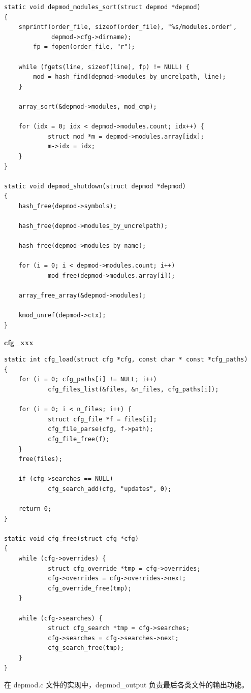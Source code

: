 {\begin{shaded}
\begin{verbatim}
static void depmod_modules_sort(struct depmod *depmod)
{
    snprintf(order_file, sizeof(order_file), "%s/modules.order",
             depmod->cfg->dirname);
        fp = fopen(order_file, "r");

    while (fgets(line, sizeof(line), fp) != NULL) {
        mod = hash_find(depmod->modules_by_uncrelpath, line);
    }

    array_sort(&depmod->modules, mod_cmp);

    for (idx = 0; idx < depmod->modules.count; idx++) {
            struct mod *m = depmod->modules.array[idx];
            m->idx = idx;
    }
}

static void depmod_shutdown(struct depmod *depmod)
{
    hash_free(depmod->symbols);

    hash_free(depmod->modules_by_uncrelpath);

    hash_free(depmod->modules_by_name);

    for (i = 0; i < depmod->modules.count; i++)
            mod_free(depmod->modules.array[i]);

    array_free_array(&depmod->modules);

    kmod_unref(depmod->ctx);
}
\end{verbatim}\end{shaded}}
\textbf{cfg\_xxx}

{\begin{shaded}\begin{verbatim}
static int cfg_load(struct cfg *cfg, const char * const *cfg_paths)
{
    for (i = 0; cfg_paths[i] != NULL; i++)
            cfg_files_list(&files, &n_files, cfg_paths[i]);

    for (i = 0; i < n_files; i++) {
            struct cfg_file *f = files[i];
            cfg_file_parse(cfg, f->path);
            cfg_file_free(f);
    }
    free(files);

    if (cfg->searches == NULL)
            cfg_search_add(cfg, "updates", 0);

    return 0;
}

static void cfg_free(struct cfg *cfg)
{
    while (cfg->overrides) {
            struct cfg_override *tmp = cfg->overrides;
            cfg->overrides = cfg->overrides->next;
            cfg_override_free(tmp);
    }

    while (cfg->searches) {
            struct cfg_search *tmp = cfg->searches;
            cfg->searches = cfg->searches->next;
            cfg_search_free(tmp);
    }
}
\end{verbatim}\end{shaded}}
在 depmod.c 文件的实现中，depmod\_output 负责最后各类文件的输出功能。

